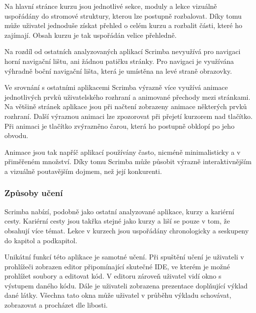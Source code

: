 Na hlavní stránce kurzu jsou jednotlivé sekce, moduly a lekce vizuálně uspořádány do stromové struktury, kterou lze postupně rozbalovat. Díky tomu může uživatel jednoduše získat přehled o celém kurzu a rozbalit části, které ho zajímají. Obsah kurzu je tak uspořádán velice přehledně.


Na rozdíl od ostatních analyzovaných aplikací Scrimba nevyužívá pro navigaci horní navigační lištu, ani žádnou patičku stránky. Pro navigaci je využívána výhradně boční navigační lišta, která je umístěna na levé straně obrazovky.


Ve srovnání s ostatními aplikacemi Scrimba výrazně více využívá animace jednotlivých prvků uživatelského rozhraní a animované přechody mezi stránkami. Na většině stránek aplikace jsou při načtení zobrazeny animace některých prvků rozhraní. Další výraznou animaci lze zpozorovat při přejetí kurzorem nad tlačítko. Při animaci je tlačítko zvýrazněno čarou, která ho postupně obklopí po jeho obvodu.

Animace jsou tak napříč aplikací používány často, nicméně minimalisticky a v přiměřeném množství. Díky tomu Scrimba může působit výrazně interaktivnějším a vizuálně poutavějším dojmem, než její konkurenti.

\subsubsection{Způsoby učení}


Scrimba nabízí, podobně jako ostatní analyzované aplikace, kurzy a kariérní cesty. Kariérní cesty jsou takřka stejné jako kurzy a liší se pouze v tom, že obsahují více témat. Lekce v kurzech jsou uspořádány chronologicky a seskupeny do kapitol a podkapitol.


Unikátní funkcí této aplikace je samotné učení. Při spuštění učení je uživateli v prohlížeči zobrazen editor připomínající skutečné IDE, ve kterém je možné prohlížet soubory a editovat kód. V editoru zároveň uživatel vidí okno s výstupem daného kódu. Dále je uživateli zobrazena prezentace doplňující výklad dané látky. Všechna tato okna může uživatel v průběhu výkladu schovávat, zobrazovat a procházet dle libosti.

